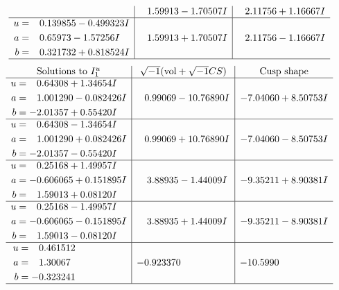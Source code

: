 \documentclass[1p]{elsarticle_modified}
\theoremstyle{definition}
\newcommand{\I}{\sqrt{-1}}
\begin{document}
$$\begin{array}{c|c|c}
 & \phantom{-}1.59913 - 1.70507 I & \phantom{-}2.11756 + 1.16667 I \\ \hline\begin{aligned}
u &= \phantom{-}0.139855 - 0.499323 I \\
a &= \phantom{-}0.65973 - 1.57256 I \\
b &= \phantom{-}0.321732 + 0.818524 I\end{aligned}
 & \phantom{-}1.59913 + 1.70507 I & \phantom{-}2.11756 - 1.16667 I\\
 \hline 
 \end{array}$$\newpage$$\begin{array}{c|c|c}  
\text{Solutions to }I^u_{1}& \I (\text{vol} + \sqrt{-1}CS) & \text{Cusp shape}\\
 \hline 
\begin{aligned}
u &= \phantom{-}0.64308 + 1.34654 I \\
a &= \phantom{-}1.001290 - 0.082426 I \\
b &= -2.01357 + 0.55420 I\end{aligned}
 & \phantom{-}0.99069 - 10.76890 I & -7.04060 + 8.50753 I \\ \hline\begin{aligned}
u &= \phantom{-}0.64308 - 1.34654 I \\
a &= \phantom{-}1.001290 + 0.082426 I \\
b &= -2.01357 - 0.55420 I\end{aligned}
 & \phantom{-}0.99069 + 10.76890 I & -7.04060 - 8.50753 I \\ \hline\begin{aligned}
u &= \phantom{-}0.25168 + 1.49957 I \\
a &= -0.606065 + 0.151895 I \\
b &= \phantom{-}1.59013 + 0.08120 I\end{aligned}
 & \phantom{-}3.88935 - 1.44009 I & -9.35211 + 8.90381 I \\ \hline\begin{aligned}
u &= \phantom{-}0.25168 - 1.49957 I \\
a &= -0.606065 - 0.151895 I \\
b &= \phantom{-}1.59013 - 0.08120 I\end{aligned}
 & \phantom{-}3.88935 + 1.44009 I & -9.35211 - 8.90381 I \\ \hline\begin{aligned}
u &= \phantom{-}0.461512\phantom{ +0.000000I} \\
a &= \phantom{-}1.30067\phantom{ +0.000000I} \\
b &= -0.323241\phantom{ +0.000000I}\end{aligned}
 & -0.923370\phantom{ +0.000000I} & -10.5990\phantom{ +0.000000I}\\
 \hline 
 \end{array}$$\newpage\newpage\renewcommand{\arraystretch}{1}
\end{document}
